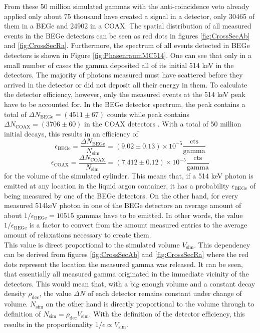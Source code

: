\documentclass[encoding=utf8,british]{tumphthesis}
\begin{document}
From these 50 million simulated gammas with the anti-coincidence veto already applied only about 75 thousand have created a signal in a detector, only 30465 of them in a BEGe and 24902 in a COAX.
The spatial distribution of all measured events in the BEGe detectors can be seen as red dots in figures \ref{fig:CrossSecAb} and \ref{fig:CrossSecRa}.
Furthermore, the spectrum of all events detected in BEGe detectors is shown in Figure \ref{fig:PhasenraumMC514}.
One can see that only in a small number of cases the gamma deposited all of its initial 514 keV in the detectors.
The majority of photons measured must have scattered before they arrived in the detector or did not deposit all their energy in them.
To calculate the detector efficiency, however, only the measured events at the 514 keV peak have to be accounted for.
In the BEGe detector spectrum, the peak contains a total of \(\Delta N_{\mathrm{BEGe}} = (4511\pm67) \) counts while peak contains \(\Delta N_{\mathrm{COAX}} = (3706\pm60) \) in the COAX detectors .
With a total of 50 million initial decays, this results in an efficiency of 
\begin{equation*}
\epsilon_{\mathrm{BEGe}} = \frac{\Delta N_{\mathrm{BEGe}}}{N_{\mathrm{sim}}} = (9.02\pm0.13) \times 10^{-5}  \frac{\mathrm{cts}}{\mathrm{gamma}}
\end{equation*}
\begin{equation*}
\epsilon_{\mathrm{COAX}} = \frac{\Delta N_{\mathrm{COAX}}}{N_{\mathrm{sim}}} = (7.412\pm0.12) \times 10^{-5}  \frac{\mathrm{cts}}{\mathrm{gamma}}
\end{equation*}
for the volume of the simulated cylinder.
This means that, if a 514 keV photon is emitted at any location in the liquid argon container, it has a probability \(\epsilon_{\mathrm{BEGe}}\) of being measured by one of the BEGe detectors.
On the other hand, for every measured 514keV photon in one of the BEGe detectors an average amount of about $1 / \epsilon_{\mathrm{BEGe}} = 10515$ gammas have to be emitted.
In other words, the value $1 / \epsilon_{\mathrm{BEGe}}$ is a factor to convert from the amount measured entries to the average amount of  relaxations necessary to create them.
\\

This value is direct proportional to the simulated volume $V_{\mathrm{sim}}$.
This dependency can be derived from figures \ref{fig:CrossSecAb} and \ref{fig:CrossSecRa} where the red dots represent the location the measured gamma was released.
It can be seen, that essentially all measured gamma originated in the immediate vicinity of the detectors.
This would mean that, with a big enough volume and a constant decay density $\rho_{\mathrm{dec}}$, the value $\Delta N$ of each detector remains constant under change of volume.
$N_{\mathrm{sim}}$ on the other hand is directly proportional to the volume through to definition of $N_{\mathrm{sim}} = \rho_{\mathrm{dec}} V_{\mathrm{sim}}$.
With the definition of the detector efficiency, this results in the proportionality  $1 / \epsilon \propto V_{\mathrm{sim}}$.
\\
\end{document}
